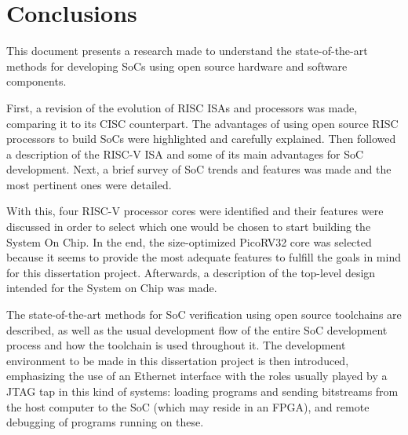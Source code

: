 
\chapter{Conclusions}
\label{chapter:conclusions}

This document presents a research made to understand the state-of-the-art
methods for developing SoCs using open source hardware and software components.

First, a revision of the evolution of RISC ISAs and processors was made,
comparing it to its CISC counterpart. The advantages of using open source RISC
processors to build SoCs were highlighted and carefully explained. Then followed
a description of the RISC-V ISA and some of its main advantages for SoC
development. Next, a brief survey of SoC trends and features was made and the
most pertinent ones were detailed.

With this, four RISC-V processor cores were identified and their features were
discussed in order to select which one would be chosen to start building the
\socname System On Chip. In the end, the size-optimized PicoRV32 core was
selected because it seems to provide the most adequate features to fulfill the
goals in mind for this dissertation project. Afterwards, a description of the
top-level design intended for the \socname System on Chip was made.

The state-of-the-art methods for SoC verification using open source toolchains
are described, as well as the usual development flow of the entire SoC
development process and how the toolchain is used throughout it. The development
environment to be made in this dissertation project is then introduced,
emphasizing the use of an Ethernet interface with the roles usually played by a
JTAG tap in this kind of systems: loading programs and sending bitstreams from
the host computer to the SoC (which may reside in an FPGA), and
remote debugging of programs running on these.

